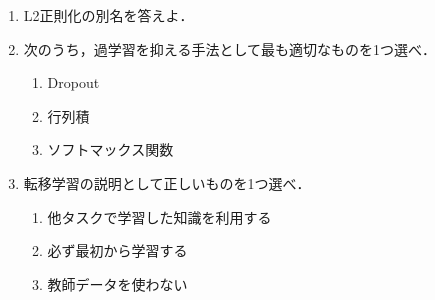 \documentclass[uplatex,a4paper,12pt]{jsarticle}
\begin{document}
\begin{enumerate}
\item L2正則化の別名を答えよ．

\item 次のうち，過学習を抑える手法として最も適切なものを1つ選べ．
\begin{enumerate}[label=(\alph*)]
\item Dropout
\item 行列積
\item ソフトマックス関数
\end{enumerate}

\item 転移学習の説明として正しいものを1つ選べ．
\begin{enumerate}[label=(\alph*)]
\item 他タスクで学習した知識を利用する
\item 必ず最初から学習する
\item 教師データを使わない
\end{enumerate}

\end{enumerate}
\end{document}

